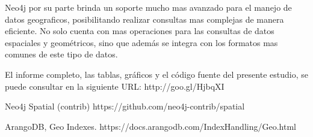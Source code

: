 \documentclass{llncs}
\begin{document}
Neo4j por su parte brinda un soporte mucho mas avanzado para el manejo de datos geograficos, posibilitando realizar consultas mas complejas de manera eficiente. No solo cuenta con mas operaciones para las consultas de datos espaciales y geométricos, sino que además se integra con los formatos mas comunes de este tipo de datos.

El informe completo, las tablas, gráficos y el código fuente del presente estudio, se puede consultar en la siguiente URL: http://goo.gl/HjbqXI

%
%
\vspace{-1em}
\begin{thebibliography}{5}
%
Neo4j Spatial (contrib)
https://github.com/neo4j-contrib/spatial

ArangoDB, Geo Indexes.
https://docs.arangodb.com/IndexHandling/Geo.html

\end{thebibliography}
\end{document}
